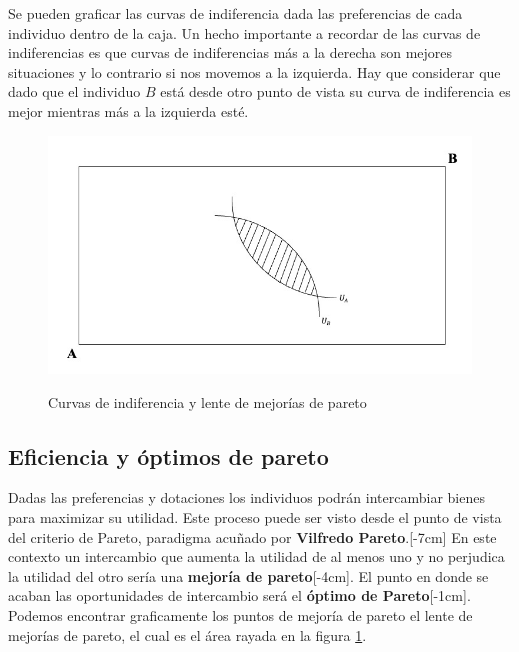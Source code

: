 Se pueden graficar las curvas de indiferencia dada las preferencias de cada individuo dentro de la caja. Un hecho importante a recordar de las curvas de indiferencias es que curvas de indiferencias más a la derecha son mejores situaciones y lo contrario si nos movemos a la izquierda. Hay que considerar que dado que el individuo $B$ está desde otro punto de vista su curva de indiferencia es mejor mientras más a la izquierda esté.
\begin{figure}[htbp]
    \centering
    \caption{Curvas de indiferencia y lente de mejorías de pareto}
    \includegraphics[width=\textwidth]{Figuras/EG Curvas de indiferencias.jpeg}
    \label{fig:caja indiferencias}
\end{figure}

\subsection{Eficiencia y óptimos de pareto}

Dadas las preferencias y dotaciones los individuos podrán intercambiar bienes para maximizar su utilidad. Este proceso puede ser visto desde el punto de vista del criterio de Pareto, paradigma acuñado por \textbf{Vilfredo Pareto}.[-7cm] En este contexto un intercambio que aumenta la utilidad de al menos uno y no perjudica la utilidad del otro sería una \textbf{mejoría de pareto}[-4cm]. El punto en donde se acaban las oportunidades de intercambio será el \textbf{óptimo de Pareto}[-1cm]. Podemos encontrar graficamente los puntos de mejoría de pareto el lente de mejorías de pareto, el cual es el área rayada en la figura \ref{fig:caja indiferencias}.

